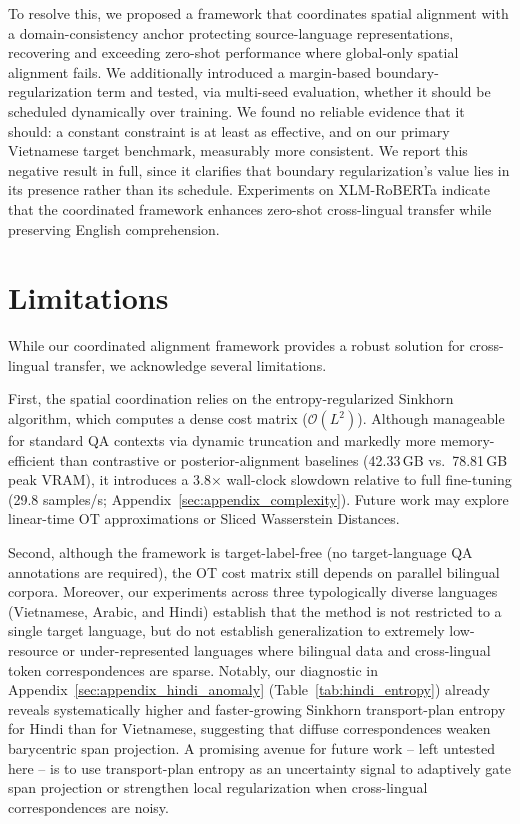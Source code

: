\documentclass[11pt]{article}
\begin{document}
To resolve this, we proposed a framework that coordinates spatial alignment with a domain-consistency anchor protecting source-language representations, recovering and exceeding zero-shot performance where global-only spatial alignment fails. We additionally introduced a margin-based boundary-regularization term and tested, via multi-seed evaluation, whether it should be scheduled dynamically over training. We found no reliable evidence that it should: a constant constraint is at least as effective, and on our primary Vietnamese target benchmark, measurably more consistent. We report this negative result in full, since it clarifies that boundary regularization's value lies in its presence rather than its schedule. Experiments on XLM-RoBERTa indicate that the coordinated framework enhances zero-shot cross-lingual transfer while preserving English comprehension.

\section*{Limitations}
While our coordinated alignment framework provides a robust solution for cross-lingual transfer, we acknowledge several limitations.

First, the spatial coordination relies on the entropy-regularized Sinkhorn algorithm, which computes a dense cost matrix ($\mathcal{O}(L^2)$). Although manageable for standard QA contexts via dynamic truncation and markedly more memory-efficient than contrastive or posterior-alignment baselines (42.33\,GB vs.\ 78.81\,GB peak VRAM), it introduces a 3.8$\times$ wall-clock slowdown relative to full fine-tuning (29.8 samples/s; Appendix~\ref{sec:appendix_complexity}). Future work may explore linear-time OT approximations or Sliced Wasserstein Distances.

Second, although the framework is target-label-free (no target-language QA annotations are required), the OT cost matrix still depends on parallel bilingual corpora. Moreover, our experiments across three typologically diverse languages (Vietnamese, Arabic, and Hindi) establish that the method is not restricted to a single target language, but do not establish generalization to extremely low-resource or under-represented languages where bilingual data and cross-lingual token correspondences are sparse. Notably, our diagnostic in Appendix~\ref{sec:appendix_hindi_anomaly} (Table~\ref{tab:hindi_entropy}) already reveals systematically higher and faster-growing Sinkhorn transport-plan entropy for Hindi than for Vietnamese, suggesting that diffuse correspondences weaken barycentric span projection. A promising avenue for future work -- left untested here -- is to use transport-plan entropy as an uncertainty signal to adaptively gate span projection or strengthen local regularization when cross-lingual correspondences are noisy.
\end{document}
